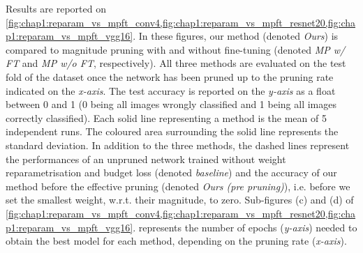 Results are reported on
\cref{fig:chap1:reparam_vs_mpft_conv4,fig:chap1:reparam_vs_mpft_resnet20,fig:chap1:reparam_vs_mpft_vgg16}.
In these figures, our method (denoted \emph{Ours}) is compared to magnitude
pruning with and without fine-tuning (denoted \emph{MP w/ FT} and \emph{MP w/o
  FT}, respectively). All three methods are evaluated on the test fold of the
dataset once the network has been pruned up to the pruning rate indicated on the
\emph{x-axis}. The test accuracy is reported on the \emph{y-axis} as a float
between 0 and 1 (0 being all images wrongly classified and 1 being all images
correctly classified). Each solid line representing a method is the mean of 5
independent runs. The coloured area surrounding the solid line represents the
standard deviation. In addition to the three methods, the dashed lines represent
the performances of an unpruned network trained without weight reparametrisation
and budget loss (denoted \emph{baseline}) and the accuracy of our method before
the effective pruning (denoted \emph{Ours (pre pruning)}), i.e. before we set
the smallest weight, w.r.t. their magnitude, to zero. Sub-figures (c) and (d) of
\cref{fig:chap1:reparam_vs_mpft_conv4,fig:chap1:reparam_vs_mpft_resnet20,fig:chap1:reparam_vs_mpft_vgg16}.
represents the number of epochs (\emph{y-axis}) needed to obtain the best model
for each method, depending on the pruning rate (\emph{x-axis}).\\


